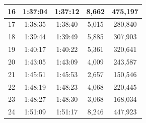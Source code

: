 \begin{table}[]
\begin{tabular}{|c|c|c|c|c|}
{\color[HTML]{000000} 16}                             & {\color[HTML]{000000} 1:37:04}                          & {\color[HTML]{000000} 1:37:12}                           & {\color[HTML]{000000} 8,662}            & {\color[HTML]{000000} 475,197}        \\ \hline
{\color[HTML]{000000} 17}                             & {\color[HTML]{000000} 1:38:35}                          & {\color[HTML]{000000} 1:38:40}                           & {\color[HTML]{000000} 5,015}            & {\color[HTML]{000000} 280,840}        \\ \hline
{\color[HTML]{000000} 18}                             & {\color[HTML]{000000} 1:39:44}                          & {\color[HTML]{000000} 1:39:49}                           & {\color[HTML]{000000} 5,885}            & {\color[HTML]{000000} 307,903}        \\ \hline
{\color[HTML]{000000} 19}                             & {\color[HTML]{000000} 1:40:17}                          & {\color[HTML]{000000} 1:40:22}                           & {\color[HTML]{000000} 5,361}            & {\color[HTML]{000000} 320,641}        \\ \hline
{\color[HTML]{000000} 20}                             & {\color[HTML]{000000} 1:43:05}                          & {\color[HTML]{000000} 1:43:09}                           & {\color[HTML]{000000} 4,009}            & {\color[HTML]{000000} 243,587}        \\ \hline
{\color[HTML]{000000} 21}                             & {\color[HTML]{000000} 1:45:51}                          & {\color[HTML]{000000} 1:45:53}                           & {\color[HTML]{000000} 2,657}            & {\color[HTML]{000000} 150,546}        \\ \hline
{\color[HTML]{000000} 22}                             & {\color[HTML]{000000} 1:48:19}                          & {\color[HTML]{000000} 1:48:23}                           & {\color[HTML]{000000} 4,068}            & {\color[HTML]{000000} 220,445}        \\ \hline
{\color[HTML]{000000} 23}                             & {\color[HTML]{000000} 1:48:27}                          & {\color[HTML]{000000} 1:48:30}                           & {\color[HTML]{000000} 3,068}            & {\color[HTML]{000000} 168,034}        \\ \hline
{\color[HTML]{000000} 24}                             & {\color[HTML]{000000} 1:51:09}                          & {\color[HTML]{000000} 1:51:17}                           & {\color[HTML]{000000} 8,246}            & {\color[HTML]{000000} 447,923}        \\ \hline

\end{tabular}
\end{table}
